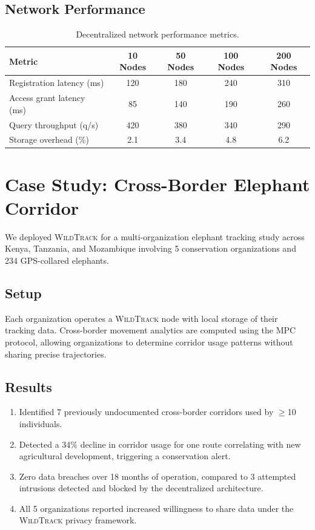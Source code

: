\documentclass[11pt,letterpaper]{article}
\newcommand{\WildTrack}{\textsc{WildTrack}}
\begin{document}
\subsection{Network Performance}

\begin{table}[htbp]
\centering
\caption{Decentralized network performance metrics.}
\label{tab:network}
\begin{tabular}{lcccc}
\toprule
\textbf{Metric} & \textbf{10 Nodes} & \textbf{50 Nodes} & \textbf{100 Nodes} & \textbf{200 Nodes} \\
\midrule
Registration latency (ms) & 120 & 180 & 240 & 310 \\
Access grant latency (ms) & 85 & 140 & 190 & 260 \\
Query throughput (q/s) & 420 & 380 & 340 & 290 \\
Storage overhead (\%) & 2.1 & 3.4 & 4.8 & 6.2 \\
\bottomrule
\end{tabular}
\end{table}

\section{Case Study: Cross-Border Elephant Corridor}

We deployed \WildTrack{} for a multi-organization elephant tracking study across Kenya, Tanzania, and Mozambique involving 5 conservation organizations and 234 GPS-collared elephants.

\subsection{Setup}

Each organization operates a \WildTrack{} node with local storage of their tracking data. Cross-border movement analytics are computed using the MPC protocol, allowing organizations to determine corridor usage patterns without sharing precise trajectories.

\subsection{Results}

\begin{enumerate}[leftmargin=*]
    \item Identified 7 previously undocumented cross-border corridors used by $\geq$10 individuals.
    \item Detected a 34\% decline in corridor usage for one route correlating with new agricultural development, triggering a conservation alert.
    \item Zero data breaches over 18 months of operation, compared to 3 attempted intrusions detected and blocked by the decentralized architecture.
    \item All 5 organizations reported increased willingness to share data under the \WildTrack{} privacy framework.
\end{enumerate}
\end{document}
